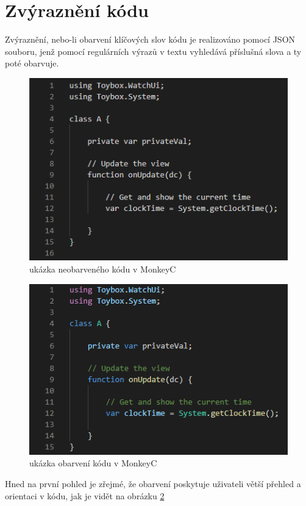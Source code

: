 \section{Zvýraznění kódu}

Zvýraznění, nebo-li obarvení klíčových slov kódu je realizováno pomocí JSON souboru, jenž pomocí regulárních výrazů v textu vyhledává příslušná slova a ty poté obarvuje.
\\
\begin{figure}
	\centering
	\includegraphics[]{images/uncolored_code}
	\caption{ukázka neobarveného kódu v MonkeyC}
	\label{img:uncolored_code}
\end{figure}

\begin{figure}
	\centering
	\includegraphics[]{images/colored_code}
	\caption{ukázka obarvení kódu v MonkeyC} 
	\label{img:colored_code}
\end{figure}
	
Hned na první pohled je zřejmé, že obarvení poskytuje uživateli větší přehled a orientaci v kódu, jak je vidět na obrázku \ref{img:colored_code}


